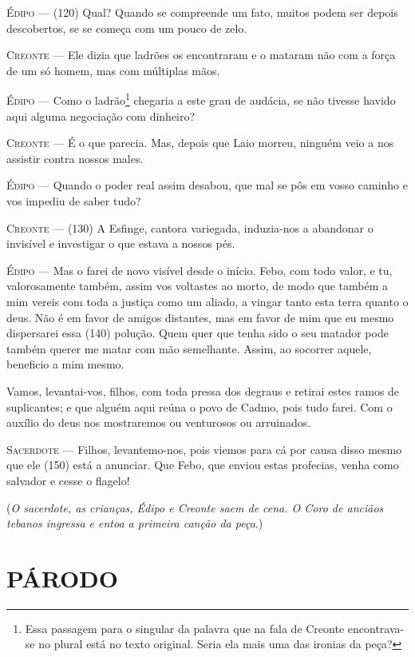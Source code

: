 \textsc{Édipo} --- (120) Qual? Quando se compreende um fato, muitos podem ser depois
descobertos, se se começa com um pouco de zelo.

\textsc{Creonte} --- Ele dizia que ladrões os encontraram e o mataram não com a força de um
só homem, mas com múltiplas mãos.

\textsc{Édipo} --- Como o ladrão\footnote{Essa passagem para o singular da palavra que na
  fala de Creonte encontrava-se no plural está no texto original. Seria
  ela mais uma das ironias da peça?} chegaria a este grau de audácia, se
não tivesse havido aqui alguma negociação com dinheiro?

\textsc{Creonte} --- É o que parecia. Mas, depois que Laio morreu, ninguém veio a nos
assistir contra nossos males.

\textsc{Édipo} --- Quando o poder real assim desabou, que mal se pôs em vosso caminho e vos
impediu de saber tudo?

\textsc{Creonte} --- (130) A Esfinge, cantora variegada, induzia-nos a abandonar o invisível
e investigar o que estava a nossos pés.

\textsc{Édipo} --- Mas o farei de novo visível desde o início. Febo, com todo valor, e tu,
valorosamente também, assim vos voltastes ao morto, de modo que também a
mim vereis com toda a justiça como um aliado, a vingar tanto esta terra
quanto o deus. Não é em favor de amigos distantes, mas em favor de mim
que eu mesmo dispersarei essa (140) polução. Quem quer que tenha sido o
seu matador pode também querer me matar com mão semelhante. Assim, ao
socorrer aquele, beneficio a mim mesmo.

Vamos, levantai-vos, filhos, com toda pressa dos degraus e retirai estes
ramos de suplicantes; e que alguém aqui reúna o povo de Cadmo, pois tudo
farei. Com o auxílio do deus nos mostraremos ou venturosos ou
arruinados.

\textsc{Sacerdote} --- Filhos, levantemo-nos, pois viemos para cá por causa disso mesmo que ele
(150) está a anunciar. Que Febo, que enviou estas profecias, venha como
salvador e cesse o flagelo!

(\emph{O sacerdote, as crianças, Édipo e Creonte saem de cena. O Coro de
anciãos tebanos ingressa e entoa a primeira canção da peça}.)

\section{PÁRODO}

